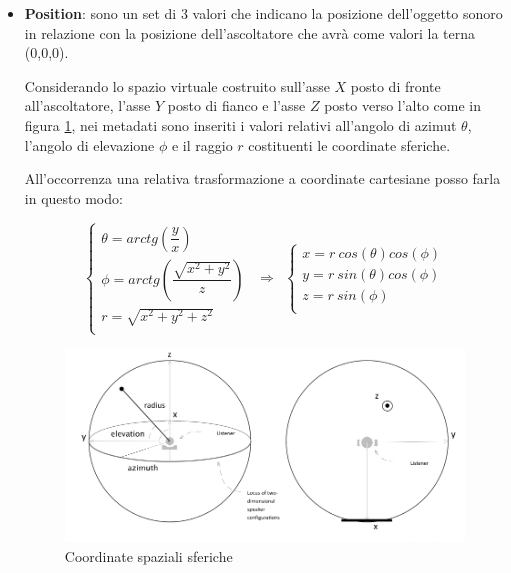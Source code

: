\documentclass[12pt,a4paper]{report}
\begin{document}
\begin{itemize}\label{aaa}
\item \textbf{Position}: sono un set di 3 valori che indicano la posizione dell'oggetto sonoro in relazione con la posizione dell'ascoltatore che avrà come valori la terna (0,0,0).

Considerando lo spazio virtuale costruito sull'asse $X$ posto di fronte all'ascoltatore, l'asse $Y$ posto di fianco e l'asse $Z$ posto verso l'alto come in figura \ref{fig:coordinate}, nei metadati sono inseriti i valori relativi all'angolo di azimut $\theta$, l'angolo di elevazione $\phi$ e il raggio $r$ costituenti le coordinate sferiche.

All'occorrenza una relativa trasformazione a coordinate cartesiane posso farla in questo modo:

\begin{equation}
\left\{\begin{matrix}
\theta = arctg \left(\dfrac{y}{x} \right) \\
\phi   = arctg \left(\dfrac{\sqrt{x^2 + y^2 }}{z} \right) \\
r = \sqrt{x^2 +y^2 +z^2 }\\
\end{matrix}\right.	 \ \ \Rightarrow \ \  \left\{\begin{matrix}
x= r\ cos(\theta) cos(\phi) \\
y= r\ sin(\theta) cos(\phi)\\
z= r\ sin(\phi)\\
\end{matrix}\right.
	\label{eq:coordinatepolari}
\end{equation}

\begin{figure}[htbp]
	\centering
	\includegraphics[scale=0.40]{figures/azimut.png}
	\caption {Coordinate spaziali sferiche}
	\label{fig:coordinate}
	\end{figure}


\end{itemize}
\end{document}
